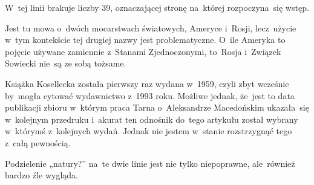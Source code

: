 \documentclass[a4paper,11pt]{article}
\begin{document}


\start {} W~tej linii brakuje liczby 39, oznaczającej stronę
na~której rozpoczyna~się wstęp.

\vspace{\spaceFour}





\start {} Jest tu mowa o~dwóch mocarstwach światowych, Ameryce
i~Rosji, lecz~użycie w~tym kontekście tej drugiej nazwy jest
problematyczne. O~ile Ameryka to pojęcie używane zamiennie z~Stanami
Zjednoczonymi, to~Rosja i~Związek Sowiecki nie~są ze sobą tożsame.

\vspace{\spaceFour}





\start {} Książka Kosellecka została pierwszy raz wydana
w~1959, czyli zbyt wcześnie by~mogła cytować wydawnictwo z~1993 roku.
Możliwe jednak, że~jest to data publikacji zbioru w~którym praca Tarna
o~Aleksandrze Macedońskim ukazała~się w~kolejnym przedruku i~akurat
ten odnośnik do~tego artykułu został wybrany w~którymś z~kolejnych
wydań. Jednak nie jestem w~stanie rozstrzygnąć tego z~całą pewnością.

\vspace{\spaceFour}





\start {} Podzielenie „natury?” na~te dwie linie
jest nie tylko niepoprawne, ale~również bardzo źle wygląda.

\vspace{\spaceFour}





\end{document}

